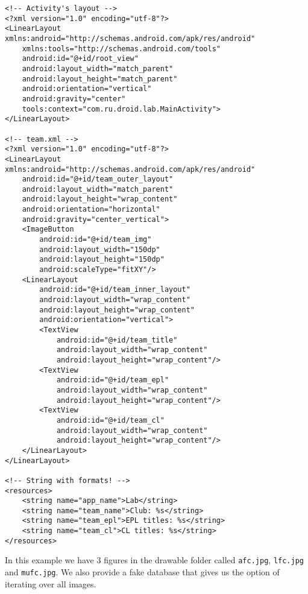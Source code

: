 \begin{lstlisting}[style=A_XML, caption={XML for inflater demo}, label={listing:xmlinfldem}]
<!-- Activity's layout -->
<?xml version="1.0" encoding="utf-8"?>
<LinearLayout xmlns:android="http://schemas.android.com/apk/res/android"
    xmlns:tools="http://schemas.android.com/tools"
    android:id="@+id/root_view"
    android:layout_width="match_parent"
    android:layout_height="match_parent"
    android:orientation="vertical"
    android:gravity="center"
    tools:context="com.ru.droid.lab.MainActivity">
</LinearLayout>

<!-- team.xml -->
<?xml version="1.0" encoding="utf-8"?>
<LinearLayout xmlns:android="http://schemas.android.com/apk/res/android"
    android:id="@+id/team_outer_layout"
    android:layout_width="match_parent"
    android:layout_height="wrap_content"
    android:orientation="horizontal"
    android:gravity="center_vertical">
    <ImageButton
        android:id="@+id/team_img"
        android:layout_width="150dp"
        android:layout_height="150dp"
        android:scaleType="fitXY"/>
    <LinearLayout
        android:id="@+id/team_inner_layout"
        android:layout_width="wrap_content"
        android:layout_height="wrap_content"
        android:orientation="vertical">
        <TextView
            android:id="@+id/team_title"
            android:layout_width="wrap_content"
            android:layout_height="wrap_content"/>
        <TextView
            android:id="@+id/team_epl"
            android:layout_width="wrap_content"
            android:layout_height="wrap_content"/>
        <TextView
            android:id="@+id/team_cl"
            android:layout_width="wrap_content"
            android:layout_height="wrap_content"/>
    </LinearLayout>
</LinearLayout>

<!-- String with formats! -->
<resources>
    <string name="app_name">Lab</string>
    <string name="team_name">Club: %s</string>
    <string name="team_epl">EPL titles: %s</string>
    <string name="team_cl">CL titles: %s</string>
</resources>
\end{lstlisting}

In this example we have 3 figures in the drawable folder called \texttt{afc.jpg}, \texttt{lfc.jpg} and \texttt{mufc.jpg}. We also provide a fake database that gives us the option of iterating over all images.

